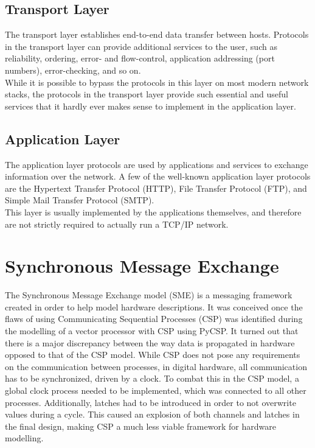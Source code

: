 \subsection{Transport Layer}
The transport layer establishes end-to-end data transfer between hosts.
Protocols in the transport layer can provide additional services to the user,
such as reliability, ordering, error- and flow-control, application addressing
(port numbers), error-checking, and so on.\\
While it is possible to bypass the protocols in this layer on most modern 
network stacks, the protocols in the transport layer provide such essential 
and useful services that it hardly ever makes sense to implement in the 
application layer. 


\subsection{Application Layer}
The application layer protocols are used by applications and services to
exchange information over the network. A few of the well-known application
layer protocols are the Hypertext Transfer Protocol (HTTP)\cite{RFC1945},
File Transfer Protocol (FTP)\cite{RFC0114}, and Simple Mail Transfer Protocol
(SMTP)\cite{RFC0788}.\\
This layer is usually implemented by the applications themselves, and therefore
are not strictly required to actually run a TCP/IP network.





\section{Synchronous Message Exchange}
The Synchronous Message Exchange model (SME) is a messaging framework created in 
order to help model hardware descriptions\cite{sme_for_hardware_designs}.
It was conceived once the flaws of using Communicating Sequential Processes (CSP)
was identified during the modelling of a vector processor with CSP using PyCSP\cite{PyCSP}.
It turned out that there is a major discrepancy between the way data is 
propagated in hardware opposed to that of the CSP model. While CSP does not 
pose any requirements on the communication between processes, in digital hardware,
all communication has to be synchronized, driven by a clock. To combat this in 
the CSP model, a global clock process needed to be implemented, which was 
connected to all other processes. Additionally, latches had to be introduced in 
order to not overwrite values during a cycle. This caused an explosion of both
channels and latches in the final design, making CSP a much less viable framework
for hardware modelling\cite{sme_for_hardware_designs}.

